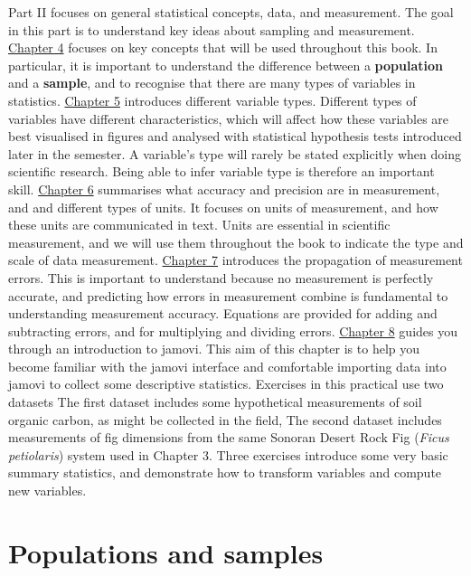 \documentclass[
]{scrbook}
\begin{document}
Part II focuses on general statistical concepts, data, and measurement.
The goal in this part is to understand key ideas about sampling and measurement.
\protect\hyperlink{Chapter_4}{Chapter 4} focuses on key concepts that will be used throughout this book.
In particular, it is important to understand the difference between a \textbf{population} and a \textbf{sample}, and to recognise that there are many types of variables in statistics.
\protect\hyperlink{Chapter_5}{Chapter 5} introduces different variable types.
Different types of variables have different characteristics, which will affect how these variables are best visualised in figures and analysed with statistical hypothesis tests introduced later in the semester.
A variable's type will rarely be stated explicitly when doing scientific research.
Being able to infer variable type is therefore an important skill.
\protect\hyperlink{Chapter_6}{Chapter 6} summarises what accuracy and precision are in measurement, and and different types of units.
It focuses on units of measurement, and how these units are communicated in text.
Units are essential in scientific measurement, and we will use them throughout the book to indicate the type and scale of data measurement.
\protect\hyperlink{Chapter_7}{Chapter 7} introduces the propagation of measurement errors.
This is important to understand because no measurement is perfectly accurate, and predicting how errors in measurement combine is fundamental to understanding measurement accuracy.
Equations are provided for adding and subtracting errors, and for multiplying and dividing errors.
\protect\hyperlink{Chapter_8}{Chapter 8} guides you through an introduction to jamovi.
This aim of this chapter is to help you become familiar with the jamovi interface and comfortable importing data into jamovi to collect some descriptive statistics.
Exercises in this practical use two datasets
The first dataset includes some hypothetical measurements of soil organic carbon, as might be collected in the field,
The second dataset includes measurements of fig dimensions from the same Sonoran Desert Rock Fig (\emph{Ficus petiolaris}) system used in Chapter 3.
Three exercises introduce some very basic summary statistics, and demonstrate how to transform variables and compute new variables.

\hypertarget{Chapter_4}{%
\chapter{Populations and samples}\label{Chapter_4}}
\end{document}
